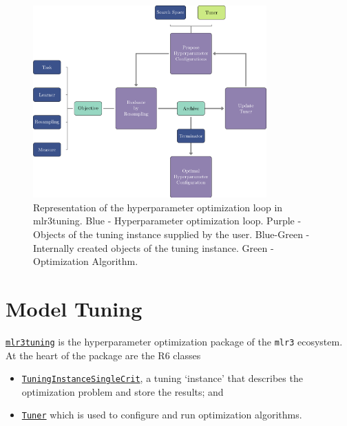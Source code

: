 \begin{figure}

{\centering \includegraphics[width=0.8\textwidth]{chapters/chapter4/Figures/mlr3book_figures-9.png}

}

\caption{\label{fig-optimization-loop-basic}Representation of the
hyperparameter optimization loop in mlr3tuning. Blue - Hyperparameter
optimization loop. Purple - Objects of the tuning instance supplied by
the user. Blue-Green - Internally created objects of the tuning
instance. Green - Optimization Algorithm.}

\end{figure}

\hypertarget{sec-model-tuning}{%
\section{Model Tuning}\label{sec-model-tuning}}

\href{https://mlr3tuning.mlr-org.com}{\texttt{mlr3tuning}}
is the hyperparameter optimization package of the \texttt{mlr3}
ecosystem. At the heart of the package are the R6 classes

\begin{itemize}
\tightlist
\item
  \href{https://mlr3tuning.mlr-org.com/reference/TuningInstanceSingleCrit.html}{\texttt{TuningInstanceSingleCrit}},
  a tuning `instance' that describes the optimization problem and store
  the results; and
\item
  \href{https://mlr3tuning.mlr-org.com/reference/Tuner.html}{\texttt{Tuner}}
  which is used to configure and run optimization algorithms.
\end{itemize}


